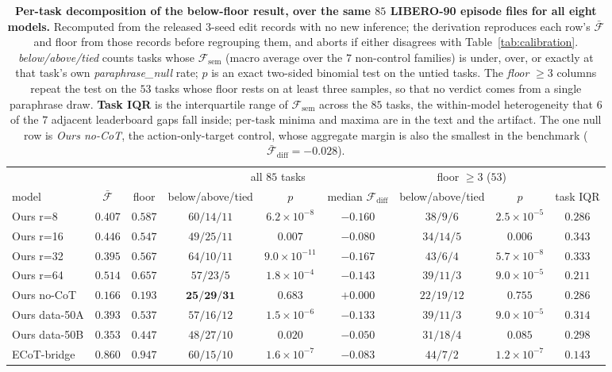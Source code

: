 \documentclass{article}
\begin{document}
\begin{table}[t]
\centering\small
\caption{\textbf{Per-task decomposition of the below-floor result, over the same $85$ LIBERO-90 episode files for all eight models.} Recomputed from the released 3-seed edit records with no new inference; the derivation reproduces each row's $\bar{\mathcal{F}}$ and floor from those records before regrouping them, and aborts if either disagrees with Table~\ref{tab:calibration}. \emph{below/above/tied} counts tasks whose $\mathcal{F}_{\text{sem}}$ (macro average over the $7$ non-control families) is under, over, or exactly at that task's own \emph{paraphrase\_null} rate; $p$ is an exact two-sided binomial test on the untied tasks. The \emph{floor} $\ge 3$ columns repeat the test on the $53$ tasks whose floor rests on at least three samples, so that no verdict comes from a single paraphrase draw. \textbf{Task IQR} is the interquartile range of $\mathcal{F}_{\text{sem}}$ across the $85$ tasks, the within-model heterogeneity that $6$ of the $7$ adjacent leaderboard gaps fall inside; per-task minima and maxima are in the text and the artifact. The one null row is \emph{Ours no-CoT}, the action-only-target control, whose aggregate margin is also the smallest in the benchmark ($\bar{\mathcal{F}}_{\text{diff}} = -0.028$).}
\label{tab:per_task}
\setlength{\tabcolsep}{4pt}
\begin{tabular}{lcccccccc}
\toprule
 & & & \multicolumn{3}{c}{all $85$ tasks} & \multicolumn{2}{c}{floor $\ge 3$ ($53$)} & \\
\cmidrule(lr){4-6}\cmidrule(lr){7-8}
model & $\bar{\mathcal{F}}$ & floor & below/above/tied & $p$ & median $\mathcal{F}_{\text{diff}}$ & below/above/tied & $p$ & task IQR \\
\midrule
Ours r=8       & $0.407$ & $0.587$ & $60/14/11$ & $6.2\!\times\!10^{-8}$ & $-0.160$ & $38/9/6$ & $2.5\!\times\!10^{-5}$ & $0.286$ \\
Ours r=16      & $0.446$ & $0.547$ & $49/25/11$ & $0.007$ & $-0.080$ & $34/14/5$ & $0.006$ & $0.343$ \\
Ours r=32      & $0.395$ & $0.567$ & $64/10/11$ & $9.0\!\times\!10^{-11}$ & $-0.167$ & $43/6/4$ & $5.7\!\times\!10^{-8}$ & $0.333$ \\
Ours r=64      & $0.514$ & $0.657$ & $57/23/5$ & $1.8\!\times\!10^{-4}$ & $-0.143$ & $39/11/3$ & $9.0\!\times\!10^{-5}$ & $0.211$ \\
Ours no-CoT    & $0.166$ & $0.193$ & $\mathbf{25/29/31}$ & $\mathbf{0.683}$ & $+0.000$ & $22/19/12$ & $0.755$ & $0.286$ \\
Ours data-50A  & $0.393$ & $0.537$ & $57/16/12$ & $1.5\!\times\!10^{-6}$ & $-0.133$ & $39/11/3$ & $9.0\!\times\!10^{-5}$ & $0.314$ \\
Ours data-50B  & $0.353$ & $0.447$ & $48/27/10$ & $0.020$ & $-0.050$ & $31/18/4$ & $\mathbf{0.085}$ & $0.298$ \\
ECoT-bridge    & $0.860$ & $0.947$ & $60/15/10$ & $1.6\!\times\!10^{-7}$ & $-0.083$ & $44/7/2$ & $1.2\!\times\!10^{-7}$ & $0.143$ \\
\bottomrule
\end{tabular}
\end{table}
\end{document}
